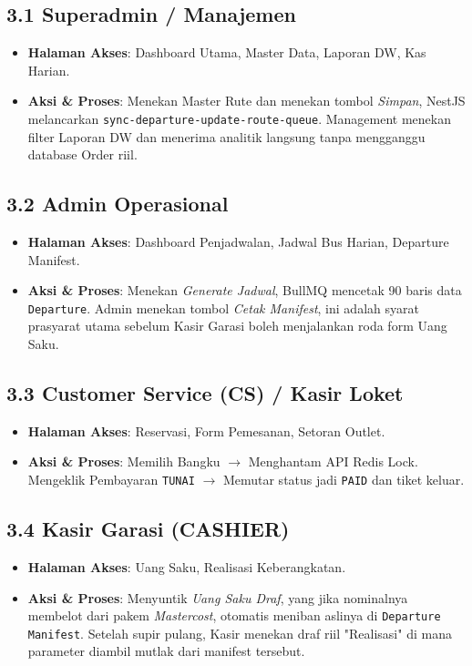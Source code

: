 \documentclass[11pt,a4paper]{article}
\begin{document}
\subsection{3.1 Superadmin / Manajemen}
\begin{itemize}
    \item \textbf{Halaman Akses}: Dashboard Utama, Master Data, Laporan DW, Kas Harian.
    \item \textbf{Aksi \& Proses}: Menekan Master Rute dan menekan tombol \textit{Simpan}, NestJS melancarkan \texttt{sync-departure-update-route-queue}. Management menekan filter Laporan DW dan menerima analitik langsung tanpa mengganggu database Order riil.
\end{itemize}

\subsection{3.2 Admin Operasional}
\begin{itemize}
    \item \textbf{Halaman Akses}: Dashboard Penjadwalan, Jadwal Bus Harian, Departure Manifest.
    \item \textbf{Aksi \& Proses}: Menekan \textit{Generate Jadwal}, BullMQ mencetak 90 baris data \texttt{Departure}. Admin menekan tombol \textit{Cetak Manifest}, ini adalah syarat prasyarat utama sebelum Kasir Garasi boleh menjalankan roda form Uang Saku.
\end{itemize}

\subsection{3.3 Customer Service (CS) / Kasir Loket}
\begin{itemize}
    \item \textbf{Halaman Akses}: Reservasi, Form Pemesanan, Setoran Outlet.
    \item \textbf{Aksi \& Proses}: Memilih Bangku $\rightarrow$ Menghantam API Redis Lock. Mengeklik Pembayaran \texttt{TUNAI} $\rightarrow$ Memutar status jadi \texttt{PAID} dan tiket keluar.
\end{itemize}

\subsection{3.4 Kasir Garasi (CASHIER)}
\begin{itemize}
    \item \textbf{Halaman Akses}: Uang Saku, Realisasi Keberangkatan.
    \item \textbf{Aksi \& Proses}: Menyuntik \textit{Uang Saku Draf}, yang jika nominalnya membelot dari pakem \textit{Mastercost}, otomatis meniban aslinya di \texttt{Departure Manifest}. Setelah supir pulang, Kasir menekan draf riil "Realisasi" di mana parameter diambil mutlak dari manifest tersebut.
\end{itemize}
\end{document}
